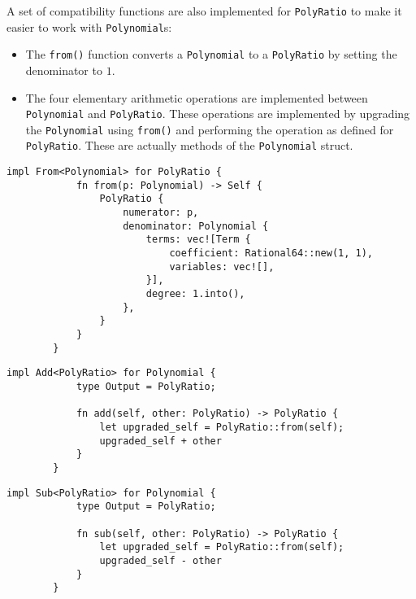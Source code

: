 A set of compatibility functions are also implemented for \verb|PolyRatio| to make it easier to work with \verb|Polynomial|s:

\begin{itemize}
    \item The \verb|from()| function converts a \verb|Polynomial| to a \verb|PolyRatio| by setting the denominator to $1$.
    \item The four elementary arithmetic operations are implemented between \verb|Polynomial| and \verb|PolyRatio|. These operations are implemented by upgrading the \verb|Polynomial| using \verb|from()| and performing the operation as defined for \verb|PolyRatio|. These are actually methods of the \verb|Polynomial| struct.
\end{itemize}

    \begin{lstlisting}[caption={The implementation of the \texttt{from()} function for the \texttt{PolyRatio} struct}, label={lst:polyratio-from}]
        impl From<Polynomial> for PolyRatio {
            fn from(p: Polynomial) -> Self {
                PolyRatio {
                    numerator: p,
                    denominator: Polynomial {
                        terms: vec![Term {
                            coefficient: Rational64::new(1, 1),
                            variables: vec![],
                        }],
                        degree: 1.into(),
                    },
                }
            }
        }
    \end{lstlisting}

    \begin{lstlisting}[caption={The implementation of the addition operation between \texttt{Polynomial} and \texttt{PolyRatio}}, label={lst:polyratio-polynomial-add}]
        impl Add<PolyRatio> for Polynomial {
            type Output = PolyRatio;
        
            fn add(self, other: PolyRatio) -> PolyRatio {
                let upgraded_self = PolyRatio::from(self);
                upgraded_self + other
            }
        }
    \end{lstlisting}

    \begin{lstlisting}[caption={The implementation of the subtraction operation between \texttt{Polynomial} and \texttt{PolyRatio}}, label={lst:polyratio-polynomial-sub}]
        impl Sub<PolyRatio> for Polynomial {
            type Output = PolyRatio;
        
            fn sub(self, other: PolyRatio) -> PolyRatio {
                let upgraded_self = PolyRatio::from(self);
                upgraded_self - other
            }
        }
    \end{lstlisting}

